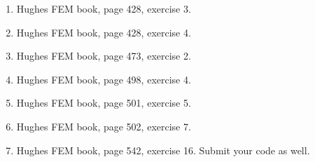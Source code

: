 \documentclass[12pt]{article}
\begin{document}
\begin{enumerate}
\item Hughes FEM book, page 428, exercise 3.

\item Hughes FEM book, page 428, exercise 4.

\item Hughes FEM book, page 473, exercise 2.

\item Hughes FEM book, page 498, exercise 4.

\item Hughes FEM book, page 501, exercise 5.

\item Hughes FEM book, page 502, exercise 7.

\item Hughes FEM book, page 542, exercise 16. Submit your code as well.



\end{enumerate}
\end{document}
